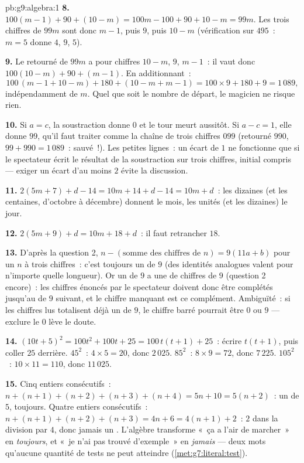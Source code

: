 \begin{solution}{pb:g9:algebra:1}
\textbf{8.} $100(m - 1) + 90 + (10 - m) = 100m - 100 + 90 + 10
- m = 99m$. Les trois chiffres de $99m$ sont donc $m - 1$, puis $9$,
puis $10 - m$ (vérification sur $495$~: $m = 5$ donne $4$, $9$,
$5$).

\textbf{9.} Le retourné de $99m$ a pour chiffres $10 - m$, $9$,
$m - 1$~: il vaut donc $100(10 - m) + 90 + (m - 1)$. En
additionnant~:
\[
100\,(m - 1 + 10 - m) + 180 + (10 - m + m - 1)
= 100 \times 9 + 180 + 9 = 1\,089 ,
\]
indépendamment de $m$. Quel que soit le nombre de départ, le
magicien ne risque rien.

\textbf{10.} Si $a = c$, la soustraction donne $0$ et le tour meurt
aussitôt. Si $a - c = 1$, elle donne $99$, qu'il faut traiter comme
la chaîne de trois chiffres $099$ (retourné $990$,
$99 + 990 = 1\,089$~: sauvé~!). Les petites lignes~: un écart de $1$
ne fonctionne que si le spectateur écrit le résultat de la
soustraction sur trois chiffres,  initial compris --- exiger un
écart d'au moins $2$ évite la discussion.

\textbf{11.} $2(5m + 7) + d - 14 = 10m + 14 + d - 14 = 10m + d$~:
les dizaines (et les centaines, d'octobre à décembre) donnent le
mois, les unités (et les dizaines) le jour.

\textbf{12.} $2(5m + 9) + d = 10m + 18 + d$~: il faut retrancher
$18$.

\textbf{13.} D'après la question 2,
$n - (\text{somme des chiffres de } n) = 9(11a + b)$ pour un $n$ à
trois chiffres~: c'est toujours un  de $9$ (des identités
analogues valent pour n'importe quelle longueur). Or un  de
$9$ a une  de chiffres  de $9$ (question 2 encore)~:
les chiffres énoncés par le spectateur doivent donc être complétés
jusqu'au  de $9$ suivant, et le chiffre manquant est ce
complément. Ambiguïté~: si les chiffres lus totalisent déjà un
 de $9$, le chiffre barré pourrait être $0$ ou $9$ ---
exclure le $0$ lève le doute.

\textbf{14.} $(10t + 5)^2 = 100t^2 + 100t + 25 =
100\,t(t + 1) + 25$~: écrire $t(t+1)$, puis coller $25$ derrière.
$45^2$~: $4 \times 5 = 20$, donc $2\,025$. $85^2$~:
$8 \times 9 = 72$, donc $7\,225$. $105^2$~: $10 \times 11 = 110$,
donc $11\,025$.

\textbf{15.} Cinq entiers consécutifs~: $n + (n+1) + (n+2) + (n+3) +
(n+4) = 5n + 10 = 5(n + 2)$~: un  de $5$, toujours. Quatre
entiers consécutifs~: $n + (n+1) + (n+2) + (n+3) = 4n + 6 =
4(n + 1) + 2$~:  $2$ dans la division par $4$, donc jamais un
. L'algèbre transforme «~ça a l'air de marcher~» en
\emph{toujours}, et «~je n'ai pas trouvé d'exemple~» en
\emph{jamais} --- deux mots qu'aucune quantité de tests ne peut
atteindre (\cref{met:g7:literal:test}).
\end{solution}
